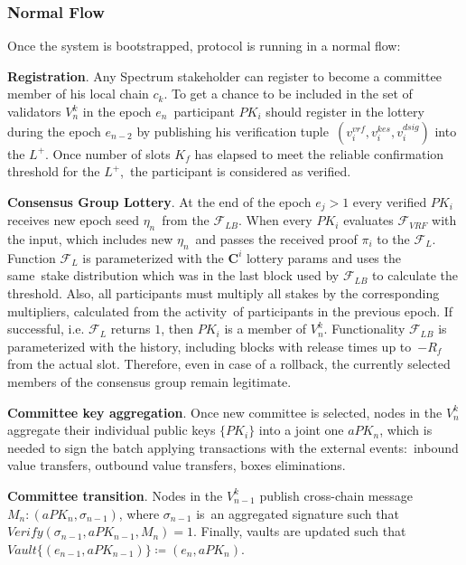 \subsubsection{Normal Flow}\label{subsubsec:normal-flow}
Once the system is bootstrapped, protocol is running in a normal flow:
\begin{legal}
    \item \textbf{Registration}.
    Any Spectrum stakeholder can register to become a committee member of his local chain $c_k$.
    To get a chance to be included in the set of validators $V^k_n$ in the epoch $e_n$\
    participant $PK_i$ should register in the lottery during the epoch $e_{n-2}$ by publishing his verification tuple\
    ${(v_i^{vrf}, v_i^{kes}, v_i^{dsig})}$ into the $L^+$.
    Once number of slots $K_f$ has elapsed to meet the reliable confirmation threshold for the $L^+$,\
    the participant is considered as verified.

    \item \textbf{Consensus Group Lottery}.
    At the end of the epoch ${e_j \gt 1}$ every verified $PK_i$ receives new epoch seed $\eta_n$\
    from the ${\mathcal{F}}_{LB}$.
    When every $PK_i$ evaluates ${\mathcal{F}}_{VRF}$ with the input, which includes new $\eta_n$\
    and passes the received proof $\pi_i$ to the ${\mathcal{F}}_{L}$.
    Function ${\mathcal{F}}_{L}$ is parameterized with the $\mathbf{C}^i$ lottery params and uses the same\
    stake distribution which was in the last block used by ${\mathcal{F}}_{LB}$ to calculate the threshold.
    Also, all participants must multiply all stakes by the corresponding multipliers, calculated from the activity\
    of participants in the previous epoch.
    If successful, i.e. ${\mathcal{F}}_{L}$ returns $1$, then $PK_i$ is a member of $V^k_n$.
    Functionality ${\mathcal{F}}_{LB}$ is parameterized with the history, including blocks with release times up to\
    ${-R_f}$ from the actual slot.
    Therefore, even in case of a rollback, the currently selected members of the consensus group remain legitimate.

    \item \textbf{Committee key aggregation}.
    Once new committee is selected, nodes in the $V^k_n$ aggregate their individual public keys $\{PK_i\}$ into
    a joint one $aPK_n$, which is needed to sign the batch applying transactions with the external events:\
    inbound value transfers, outbound value transfers, boxes eliminations.

    \item \textbf{Committee transition}.
    Nodes in the $V^k_{n - 1}$ publish cross-chain message ${M_n : (aPK_n, \sigma_{n-1})}$, where $\sigma_{n-1}$ is\
    an aggregated signature such that ${Verify(\sigma_{n-1}, aPK_{n-1}, M_n) = 1}$.
    Finally, vaults are updated such that ${Vault\{(e_{n-1}, aPK_{n-1})\} \coloneqq(e_n, aPK_n)}$.


\end{legal}
